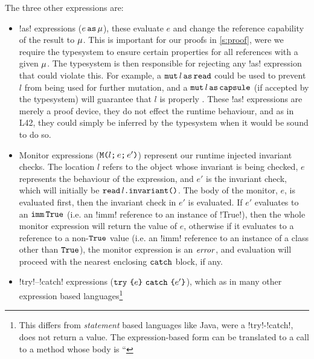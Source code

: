 The three other expressions are:
\begin{itemize}
	\item \Q!as! expressions ($e\,\texttt{as}\,\mu$), these evaluate $e$ and change the reference capability of the result to $\mu$.
	This is important for our proofs in \ref{s:proof}, were we require the typesystem to ensure certain properties for all references with a given $\mu$.
	The typesystem is then responsible for rejecting any \Q!as! expression that could violate this.
	For example, a $\texttt{mut}\,l\,\texttt{as}\,\texttt{read}$ could be used to prevent $l$ from being used for further mutation, and a  $\texttt{mut}\,l\,\texttt{as}\,\texttt{capsule}$ (if accepted by the typesystem) will guarantee that $l$ is properly \encap.
	These \Q!as! expressions are merely a proof device, they do not effect the runtime behaviour, and as in L42, they could simply be inferred by the typesystem when it would be sound to do so.
	\item Monitor expressions ($\texttt{M}\texttt{(}{}l\texttt{;}\,e\texttt{;}\,e'\texttt{)}$) represent our runtime injected invariant checks. The location $l$ refers to the object whose invariant is being checked, $e$ represents the behaviour of the expression, and $e'$ is the invariant check, which will initially be $\texttt{read}\,l\texttt{.} \texttt{invariant}\texttt{(}\texttt{)}$. The body of the monitor, $e$, is evaluated first, then the invariant check in $e'$ is evaluated. If $e'$ evaluates to an $\texttt{imm}\,\texttt{True}$ (i.e. an \Q!imm! reference to an instance of \Q!True!), then the whole monitor expression will return the value of $e$, otherwise if it evaluates to a reference to a non-$\texttt{True}$ value (i.e. an \Q!imm! reference to an instance of a class other than $\texttt{True}$), the monitor expression is an $\mathit{error}$, and evaluation will proceed with the nearest enclosing $\texttt{catch}$ block, if any.
	\item \Q!try!--\Q!catch! expressions ($\texttt{try}\ \texttt{\{} e\texttt{\}}\ \texttt{catch}\ \texttt{\{} e'\texttt{\}}$), which as in many other expression based languages\footnote{
		This differs from \emph{statement} based languages like Java, were a \Q!try!-\Q!catch!, does not return a value.
		The expression-based form can be translated to a call to a method whose body is ``%
}
\end{itemize}
